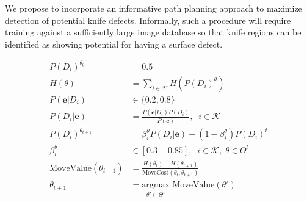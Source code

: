 \documentclass[letterpaper, 10 pt, conference]{ieeeconf}  %
\begin{document}
We propose to incorporate an informative path planning approach to maximize detection of potential knife defects. Informally, such a procedure will require training against a sufficiently large image database so that knife regions can be identified as showing potential for having a surface defect.

\begin{align}
    P(D_i)^{\theta_0} &= 0.5
    \label{eq: initDist}
    \\
    H(\theta) &= \sum_{i\in\mathcal{K}} H(P(D_i)^\theta)
    \label{eq: totalKnifeEntropyDist}
    \\
    P(\mathbf{e}|D_i) &\in \{0.2,0.8\}
    \label{eq:iinitVisionAccuracy}\\   
    P(D_i|\mathbf{e}) &= \frac{P(\mathbf{e}|D_i) P(D_i)}{P(\mathbf{e})}, \;\;i\in \mathcal{K} 
    \label{eq: bayesianUpdate}
    \\ 
    P(D_i)^{\theta_{t+1}} &= \beta_i^{\theta} P(D_i|\mathbf{e}) + (1 - \beta_i^{\theta}) P(D_i)^{t}
    \label{eq: confidenceValueUpdate}
    \\
    \beta_i^{\theta} &\in [0.3 - 0.85], \;\;i\in\mathcal{K},\;\theta\in\Theta^t
    \label{eq: confidenceValueRange}
    \\
    \text{MoveValue}(\theta_{t+1}) &= \frac{H(\theta_t) - H(\theta_{t+1})}{\text{MoveCost}(\theta_t,\theta_{t+1})}
    \label{eq: entropyReduction}
    \\
    \theta_{t+1} &= \underset{\theta'\in\Theta^t}{\text{argmax}}\text{ MoveValue}(\theta')
    \label{eq: maximization}
\end{align}
\end{document}
